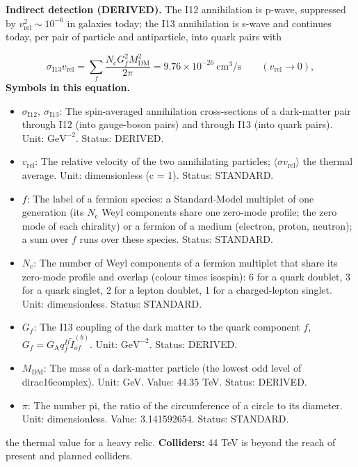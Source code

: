 \documentclass[
  10pt,
]{article}
\providecommand{\tightlist}{%
  \setlength{\itemsep}{0pt}\setlength{\parskip}{0pt}}
\begin{document}
\textbf{Indirect detection (DERIVED).} The I12 annihilation is p-wave,
suppressed by \(v_{\mathrm{rel}}^2 \sim 10^{-6}\) in galaxies today; the
I13 annihilation is s-wave and continues today, per pair of particle and
antiparticle, into quark pairs with

\[ \sigma_{\mathrm{I13}}v_{\mathrm{rel}} = \sum_f\frac{N_{\mathrm{c}}G_f^2M_{\mathrm{DM}}^2}{2\pi} = 9.76\times10^{-26}\ \text{cm}^3/\text{s}\qquad (v_{\mathrm{rel}} \to 0), \]
\textbf{Symbols in this equation.}

\begin{itemize}
\tightlist
\item
  \(\sigma_{\mathrm{I12}},\ \sigma_{\mathrm{I13}}\): The spin-averaged
  annihilation cross-sections of a dark-matter pair through I12 (into
  gauge-boson pairs) and through I13 (into quark pairs). Unit:
  \(\mathrm{GeV}^{-2}\). Status: DERIVED.
\item
  \(v_{\mathrm{rel}}\): The relative velocity of the two annihilating
  particles; \(\langle\sigma v_{\mathrm{rel}}\rangle\) the thermal
  average. Unit: dimensionless (c = 1). Status: STANDARD.
\item
  \(f\): The label of a fermion species: a Standard-Model multiplet of
  one generation (its \(N_{\mathrm{c}}\) Weyl components share one
  zero-mode profile; the zero mode of each chirality) or a fermion of a
  medium (electron, proton, neutron); a sum over \(f\) runs over these
  species. Status: STANDARD.
\item
  \(N_{\mathrm{c}}\): The number of Weyl components of a fermion
  multiplet that share its zero-mode profile and overlap (colour times
  isospin): 6 for a quark doublet, 3 for a quark singlet, 2 for a lepton
  doublet, 1 for a charged-lepton singlet. Unit: dimensionless. Status:
  STANDARD.
\item
  \(G_f\): The I13 coupling of the dark matter to the quark component
  \(f\), \(G_f = G_{\mathrm{A}}q^B_f\tilde I^{(b)}_{of}\). Unit:
  \(\mathrm{GeV}^{-2}\). Status: DERIVED.
\item
  \(M_{\mathrm{DM}}\): The mass of a dark-matter particle (the lowest
  odd level of dirac16complex). Unit: GeV. Value: 44.35 TeV. Status:
  DERIVED.
\item
  \(\pi\): The number pi, the ratio of the circumference of a circle to
  its diameter. Unit: dimensionless. Value: 3.141592654. Status:
  STANDARD.
\end{itemize}

the thermal value for a heavy relic. \textbf{Colliders:} 44 TeV is
beyond the reach of present and planned colliders.
\end{document}
